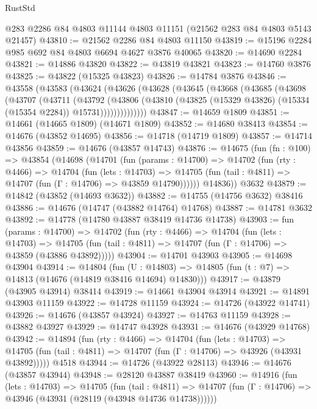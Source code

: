 \begin{lexlean}{RustStd}
\begin{coremodule}
    @283
    @2286
    @84
    @4803
    @11144
    @4803
    @11151
    (@21562 @283 @84 @4803 @5143 @21457)
@43810 := @21562 @2286 @84 @4803 @11150
@43819 := @15196 @2284 @985 @692 @84 @4803 @6694 @4627 @3876 @40065
@43820 := @14690 @2284
@43821 := @14886 @43820
@43822 := @43819 @43821
@43823 := @14760 @3876
@43825 := @43822 (@15325 @43823)
@43826 := @14784 @3876
@43846 := @43558
    (@43583
      (@43624
        (@43626
          (@43628
            (@43645
              (@43668
                (@43685
                  (@43698
                    (@43707
                      (@43711
                        (@43792
                          (@43806
                            (@43810
                              (@43825 (@15329 @43826) (@15334 (@15354 @2284)) @15731))))))))))))))
@43847 := @14659 @1809
@43851 := @14661 (@14665 @1809) (@14671 @1809)
@43852 := @14680 @38413
@43854 := @14676 (@43852 @14695)
@43856 := @14718 (@14719 @1809)
@43857 := @14714 @43856
@43859 := @14676 (@43857 @14743)
@43876 := @14675
    (fun (fn : @100) =>
    @43854
      (@14698
        (@14701
          (fun (params : @14700) =>
          @14702
            (fun (rty : @4466) =>
            @14704
              (fun (lets : @14703) =>
              @14705 (fun (tail : @4811) => @14707 (fun (Γ : @14706) => @43859 @14790))))))
        @14836))
    @3632
@43879 := @14842 (@43852 (@14693 @3632))
@43882 := @14755 (@14756 @3632) @38416
@43886 := @14676 (@14747 (@43882 @14764) @14768)
@43887 := @14781 @3632
@43892 := @14778 (@14780 @43887 @38419 @14736 @14738)
@43903 := fun (params : @14700) =>
  @14702
    (fun (rty : @4466) =>
    @14704
      (fun (lets : @14703) =>
      @14705 (fun (tail : @4811) => @14707 (fun (Γ : @14706) => @43859 (@43886 @43892)))))
@43904 := @14701 @43903
@43905 := @14698 @43904
@43914 := @14804
    (fun (U : @14803) => @14805 (fun (t : @7) => @14813 (@14676 (@14819 @38416 @14694) @14830)))
@43917 := @43879 (@43905 @43914) @38414
@43919 := @14661 @43904 @43914
@43921 := @14891 @43903 @11159
@43922 := @14728 @11159
@43924 := @14726 (@43922 @14741)
@43926 := @14676 (@43857 @43924)
@43927 := @14763 @11159
@43928 := @43882 @43927
@43929 := @14747 @43928
@43931 := @14676 (@43929 @14768)
@43942 := @14894
    (fun (rty : @4466) =>
    @14704
      (fun (lets : @14703) =>
      @14705 (fun (tail : @4811) => @14707 (fun (Γ : @14706) => @43926 (@43931 @43892)))))
    @4518
@43944 := @14726 (@43922 @28113)
@43946 := @14676 (@43857 @43944)
@43948 := @28120 @43887 @38419
@43960 := @14916
    (fun (lets : @14703) =>
    @14705
      (fun (tail : @4811) =>
      @14707 (fun (Γ : @14706) => @43946 (@43931 (@28119 (@43948 @14736 @14738))))))

\end{coremodule}
\end{lexlean}
